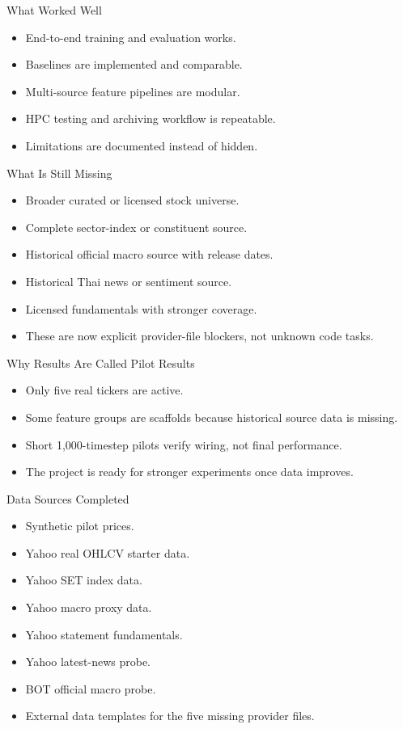 \documentclass[aspectratio=43,10pt]{beamer}
\begin{document}
\begin{frame}{What Worked Well}
\begin{itemize}
  \item End-to-end training and evaluation works.
  \item Baselines are implemented and comparable.
  \item Multi-source feature pipelines are modular.
  \item HPC testing and archiving workflow is repeatable.
  \item Limitations are documented instead of hidden.
\end{itemize}
\end{frame}

\begin{frame}{What Is Still Missing}
\begin{itemize}
  \item Broader curated or licensed stock universe.
  \item Complete sector-index or constituent source.
  \item Historical official macro source with release dates.
  \item Historical Thai news or sentiment source.
  \item Licensed fundamentals with stronger coverage.
  \item These are now explicit provider-file blockers, not unknown code tasks.
\end{itemize}
\end{frame}

\begin{frame}{Why Results Are Called Pilot Results}
\begin{itemize}
  \item Only five real tickers are active.
  \item Some feature groups are scaffolds because historical source data is missing.
  \item Short 1,000-timestep pilots verify wiring, not final performance.
  \item The project is ready for stronger experiments once data improves.
\end{itemize}
\end{frame}

\begin{frame}{Data Sources Completed}
\begin{itemize}
  \item Synthetic pilot prices.
  \item Yahoo real OHLCV starter data.
  \item Yahoo SET index data.
  \item Yahoo macro proxy data.
  \item Yahoo statement fundamentals.
  \item Yahoo latest-news probe.
  \item BOT official macro probe.
  \item External data templates for the five missing provider files.
\end{itemize}
\end{frame}
\end{document}
